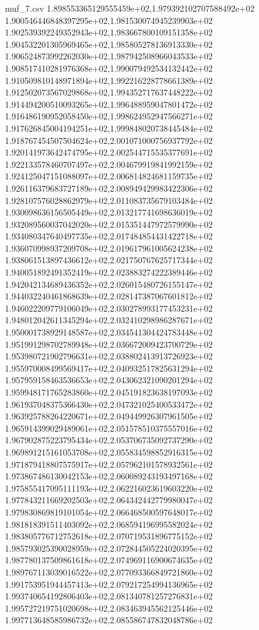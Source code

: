 \begin{filecontents*}{muf_7.csv}
1.898553365129555459e+02,1.979392102707588492e+02
1.900546446848397295e+02,1.981530074945239903e+02
1.902539392249352943e+02,1.983667800109151358e+02
1.904532201305969465e+02,1.985805278136913330e+02
1.906524873992262030e+02,1.987942508966043533e+02
1.908517410281976368e+02,1.990079492534132442e+02
1.910509810148971894e+02,1.992216228778661389e+02
1.912502073567029868e+02,1.994352717637448222e+02
1.914494200510093265e+02,1.996488959047801472e+02
1.916486190952058450e+02,1.998624952947566271e+02
1.917626845004194251e+02,1.999848020738445484e+02
1.918767454507504624e+02,2.001071000756937792e+02
1.920141973642474795e+02,2.002544715535377691e+02
1.922133578460707497e+02,2.004679919841992159e+02
1.924125047151088097e+02,2.006814824681159735e+02
1.926116379683727189e+02,2.008949429983422306e+02
1.928107576028862979e+02,2.011083735679103484e+02
1.930098636156505449e+02,2.013217741698636019e+02
1.932089560037042020e+02,2.015351447972579990e+02
1.934080347640497735e+02,2.017484854431422718e+02
1.936070998937209708e+02,2.019617961005624238e+02
1.938061513897436612e+02,2.021750767625717344e+02
1.940051892491352419e+02,2.023883274222389446e+02
1.942042134689436352e+02,2.026015480726155147e+02
1.944032240461868639e+02,2.028147387067601812e+02
1.946022209779106049e+02,2.030278993177453231e+02
1.948012042611345294e+02,2.032410298986287671e+02
1.950001738929148587e+02,2.034541304424783448e+02
1.951991298702789948e+02,2.036672009423700729e+02
1.953980721902796631e+02,2.038802413913726923e+02
1.955970008499569417e+02,2.040932517825631294e+02
1.957959158463536653e+02,2.043062321090201294e+02
1.959948171765283860e+02,2.045191823638197093e+02
1.961937048375366430e+02,2.047321025400533472e+02
1.963925788264220671e+02,2.049449926307961505e+02
1.965914399029489061e+02,2.051578510375557016e+02
1.967902875223795434e+02,2.053706735092737290e+02
1.969891215161053708e+02,2.055834598852916315e+02
1.971879418807575917e+02,2.057962101578932561e+02
1.973867486130042153e+02,2.060089243193497168e+02
1.975855417095111193e+02,2.062216023619603220e+02
1.977843211669202503e+02,2.064342442779980047e+02
1.979830869819101054e+02,2.066468500597648017e+02
1.981818391511403092e+02,2.068594196995582024e+02
1.983805776712752618e+02,2.070719531896775152e+02
1.985793025390028959e+02,2.072844505224020395e+02
1.987780137509861618e+02,2.074969116900674635e+02
1.989767113039016522e+02,2.077093366849721860e+02
1.991753951944457413e+02,2.079217254994136965e+02
1.993740654192806403e+02,2.081340781257276831e+02
1.995727219751020698e+02,2.083463945562125446e+02
1.997713648585986732e+02,2.085586747832048786e+02

\end{filecontents*}

